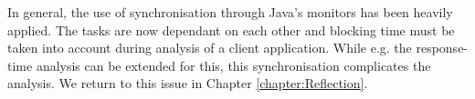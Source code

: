 In general, the use of synchronisation through Java's monitors has been heavily applied. The tasks are now dependant on each other and blocking time must be taken into account during analysis of a client application. While e.g. the response-time analysis can be extended for this\cite{alan2001real}, this synchronisation complicates the analysis. We return to this issue in Chapter \ref{chapter:Reflection}.